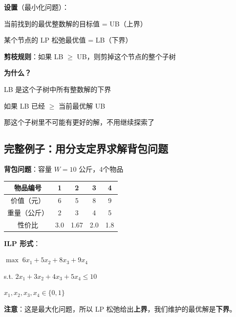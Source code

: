 \documentclass[12pt, a4paper]{ctexart}
\begin{document}
\begin{blackboard}[分支定界的剪枝规则]

\textbf{设置}（最小化问题）：

当前找到的最优整数解的目标值 = UB（上界）

某个节点的 LP 松弛最优值 = LB（下界）

\textbf{剪枝规则}：如果 LB $\geq$ UB，则剪掉这个节点的整个子树

\textbf{为什么？}

LB 是这个子树中所有整数解的下界

如果 LB 已经 $\geq$ 当前最优解 UB

那这个子树里不可能有更好的解，不用继续探索了

\begin{center}
\end{center}

\end{blackboard}

\subsection{完整例子：用分支定界求解背包问题}

\begin{blackboard}[问题设置]

\textbf{背包问题}：容量 $W = 10$ 公斤，4个物品

\begin{center}
\begin{tabular}{c|cccc}
物品编号 & 1 & 2 & 3 & 4 \\
\hline
价值（元） & 6 & 5 & 8 & 9 \\
重量（公斤） & 2 & 3 & 4 & 5 \\
性价比 & 3.0 & 1.67 & 2.0 & 1.8
\end{tabular}
\end{center}

\textbf{ILP 形式}：

$\max \; 6x_1 + 5x_2 + 8x_3 + 9x_4$

s.t. \quad $2x_1 + 3x_2 + 4x_3 + 5x_4 \leq 10$

\quad\quad $x_1, x_2, x_3, x_4 \in \{0, 1\}$

\textbf{注意}：这是最大化问题，所以 LP 松弛给出\textbf{上界}，我们维护的最优解是\textbf{下界}。

\end{blackboard}
\end{document}
